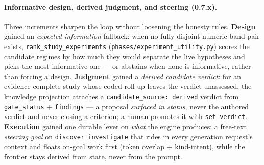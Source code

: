 \documentclass[11pt]{article}
\newcommand{\code}[1]{\texttt{\small #1}}
\begin{document}
\paragraph{Informative design, derived judgment, and steering (0.7.x).} Three increments sharpen
the loop without loosening the honesty rules. \textbf{Design} gained an \emph{expected-information}
fallback: when no fully-disjoint numeric-band pair exists, \code{rank\_study\_experiments}
(\code{phases/experiment\_utility.py}) scores the candidate regimes by how much they would separate
the live hypotheses and picks the most-informative one --- or abstains when none is informative,
rather than forcing a design. \textbf{Judgment} gained a \emph{derived candidate verdict}: for an
evidence-complete study whose coded roll-up leaves the verdict unassessed, the knowledge projection
attaches a \code{candidate\_source: derived} verdict from \code{gate\_status} + \code{findings} --- a
proposal \emph{surfaced in status}, never the authored verdict and never closing a criterion; a human
promotes it with \code{set-verdict}. \textbf{Execution} gained one durable lever on \emph{what} the
engine produces: a free-text \emph{steering goal} on \code{discover investigate} that rides in every
generation request's context and floats on-goal work first (token overlap + kind-intent), while the
frontier stays derived from state, never from the prompt.
\end{document}
